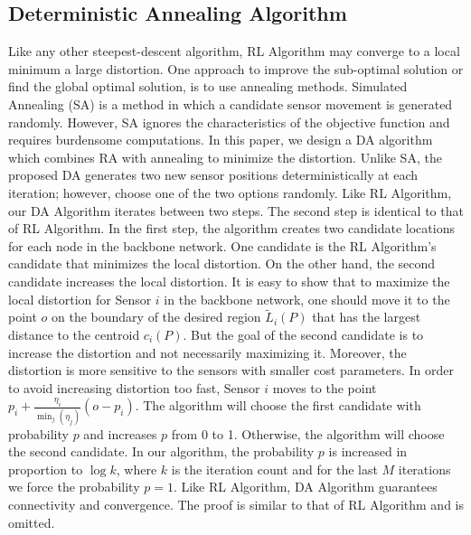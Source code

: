 \documentclass[journal,draftcls,onecolumn,12pt,twoside, narroweqnarray]{IEEEtran}
\begin{document}
\subsection{Deterministic Annealing Algorithm}
Like any other steepest-descent algorithm, RL Algorithm may converge to a local minimum a large distortion. One approach to improve the sub-optimal solution or find the global optimal solution, is to use annealing methods. Simulated Annealing (SA) \cite{SA,SR} is a method in which a candidate sensor movement is generated randomly. However, SA ignores the characteristics of the objective function and requires burdensome computations. In this paper, we design a DA algorithm which combines RA with annealing to minimize the distortion. Unlike SA, the proposed DA generates two new sensor positions deterministically at each iteration; however, choose one of the two options randomly.
Like RL Algorithm, our DA Algorithm iterates between two steps. The second step is identical to that of RL Algorithm. In the first step, the algorithm creates two candidate locations for each node in the backbone network. One candidate is the RL Algorithm's candidate that minimizes the local distortion. On the other hand, the second candidate increases the local distortion. It is easy to show that to maximize the local distortion for Sensor $i$ in the backbone network, one should move it to the point $o$ on the boundary of the desired region $\tilde{L}_i(P)$ that has the largest distance to the centroid $c_i(P)$. But the goal of the second candidate is to increase the distortion and not necessarily maximizing it. Moreover, the distortion is more sensitive to the sensors with smaller cost parameters. In order to avoid increasing distortion too fast, Sensor $i$ moves to the point $p_i+\frac{\eta_i}{\min_j(\eta_j)}(o-p_i)$. The algorithm will choose the first candidate with probability $p$ and increases $p$ from 0 to 1. Otherwise, the algorithm will choose the second candidate. In our algorithm, the probability $p$ is increased in proportion to $\log k$, where $k$ is the iteration count and for the last $M$ iterations we force the probability $p=1$.
Like RL Algorithm, DA Algorithm guarantees connectivity and convergence. The proof is similar to that of RL Algorithm and is omitted.
\end{document}
